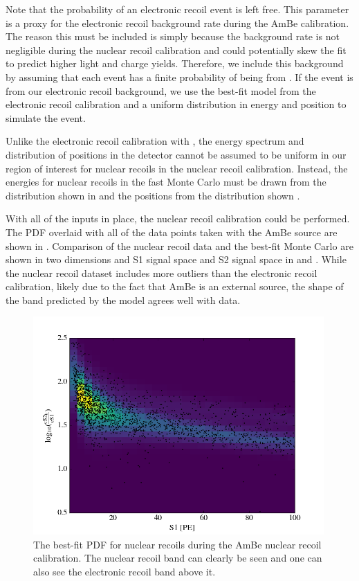 Note that the probability of an electronic recoil event is left free.  This parameter is a proxy for the electronic recoil background rate during the AmBe calibration.  The reason this must be included is simply because the  background rate is not negligible during the nuclear recoil calibration and could potentially skew the fit to predict higher light and charge yields.  Therefore, we include this background by assuming that each event has a finite probability of being from .  If the event is from our electronic recoil background, we use the best-fit model from the electronic recoil calibration and a uniform distribution in energy and position to simulate the event.

Unlike the electronic recoil calibration with , the energy spectrum and distribution of positions in the detector cannot be assumed to be uniform in our region of interest for nuclear recoils in the nuclear recoil calibration.  Instead, the energies for nuclear recoils in the fast Monte Carlo must be drawn from the distribution shown in  and the positions from the distribution shown .

With all of the inputs in place, the nuclear recoil calibration could be performed.  The PDF overlaid with all of the data points taken with the AmBe source are shown in .  Comparison of the nuclear recoil data and the best-fit Monte Carlo are shown in two dimensions and S1 signal space and S2 signal space in  and .  While the nuclear recoil dataset includes more outliers than the electronic recoil calibration, likely due to the fact that AmBe is an external source, the shape of the band predicted by the model agrees well with data.


\begin{figure}[t]
	\centering
	\includegraphics[width=0.99\textwidth]{xe1t_nr_cal_pdf}
	\caption{The best-fit PDF for nuclear recoils during the AmBe nuclear recoil calibration.  The nuclear recoil band can clearly be seen and one can also see the electronic recoil band above it.}
	\label{fig:xe1t_nr_cal_pdf}
\end{figure}

